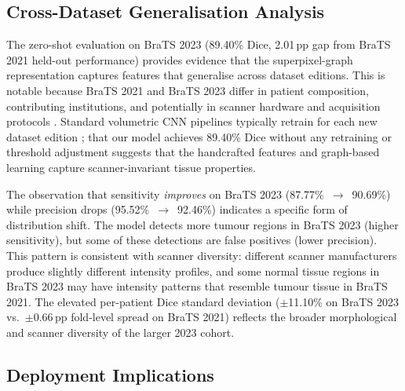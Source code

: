 \documentclass{article}
\begin{document}
\subsection{Cross-Dataset Generalisation Analysis}

The zero-shot evaluation on BraTS 2023 (89.40\% Dice, 2.01\,pp gap from BraTS
2021 held-out performance) provides evidence that the superpixel-graph
representation captures features that generalise across dataset editions. This
is notable because BraTS 2021 and BraTS 2023 differ in patient composition,
contributing institutions, and potentially in scanner hardware and acquisition
protocols \cite{menze2015multimodal, bakas2021brats}. Standard volumetric CNN
pipelines typically retrain for each new dataset edition
\cite{isensee2021nnunet}; that our model achieves 89.40\% Dice without any
retraining or threshold adjustment suggests that the handcrafted features and
graph-based learning capture scanner-invariant tissue properties.

The observation that sensitivity \textit{improves} on BraTS 2023
(87.77\%~$\rightarrow$~90.69\%) while precision drops
(95.52\%~$\rightarrow$~92.46\%) indicates a specific form of distribution
shift. The model detects more tumour regions in BraTS 2023 (higher
sensitivity), but some of these detections are false positives (lower
precision). This pattern is consistent with scanner diversity: different
scanner manufacturers produce slightly different intensity profiles, and some
normal tissue regions in BraTS 2023 may have intensity patterns that resemble
tumour tissue in BraTS 2021. The elevated per-patient Dice standard deviation
($\pm$11.10\% on BraTS 2023 vs.\ $\pm$0.66\,pp fold-level spread on BraTS
2021) reflects the broader morphological and scanner diversity of the larger
2023 cohort.

\subsection{Deployment Implications}
\end{document}

